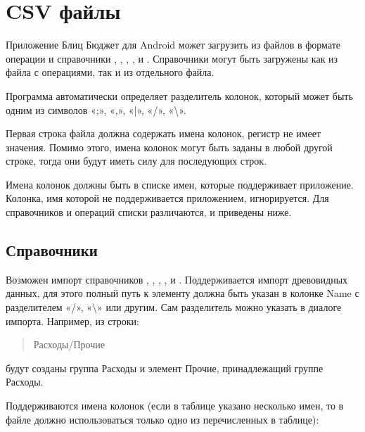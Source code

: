\documentclass[a4paper,10pt,russian]{sphinxmanual}
\begin{document}
\section{CSV файлы}
\label{\detokenize{import:id3}}
\sphinxAtStartPar
Приложение Блиц Бюджет для Android может загрузить из файлов в формате  операции и справочники
, , , ,  и .
Справочники могут быть загружены как из файла с операциями, так и из отдельного
файла.

\sphinxAtStartPar
Программа автоматически определяет разделитель колонок, который может быть одним из символов «;», «,», «|», «/», «\textbackslash{}».

\sphinxAtStartPar
Первая строка файла должна содержать имена колонок, регистр не имеет значения. Помимо этого, имена
колонок могут быть заданы в любой другой строке, тогда они будут иметь силу для последующих строк.

\sphinxAtStartPar
Имена колонок должны быть в списке имен, которые поддерживает приложение. Колонка, имя которой не поддерживается
приложением, игнорируется. Для справочников и операций списки различаются, и приведены ниже.


\subsection{Справочники}
\label{\detokenize{import:id4}}
\sphinxAtStartPar
Возможен импорт справочников , , , ,  и .
Поддерживается импорт древовидных данных, для этого полный путь к элементу должна быть указан в колонке Name с разделителем «/», «\textbackslash{}» или другим.
Сам разделитель можно указать в диалоге импорта. Например, из строки:
\begin{quote}

\sphinxAtStartPar
Расходы/Прочие
\end{quote}

\sphinxAtStartPar
будут созданы группа Расходы и элемент Прочие, принадлежащий группе Расходы.

\sphinxAtStartPar
Поддерживаются имена колонок (если в таблице указано несколько имен, то в файле должно
использоваться только одно из перечисленных в таблице):
\end{document}
